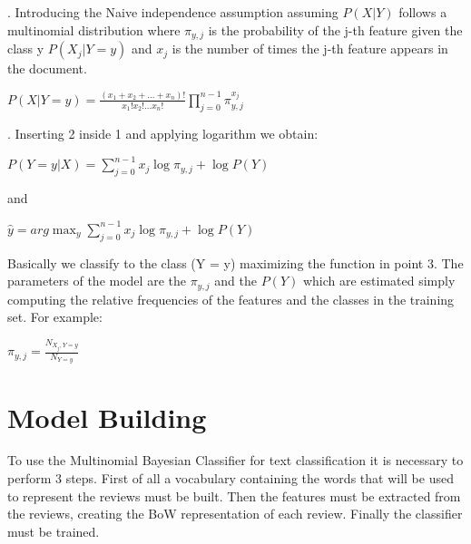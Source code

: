 \documentclass{article}
\begin{document}
\begin{multicols}{2}
. Introducing the Naive independence assumption assuming $P(X|Y)$ follows a multinomial distribution where $\pi_{y,j}$ is the probability of the j-th feature given the class y 
$P(X_j|Y=y)$ and ${x_j}$ is the number of times the j-th feature appears in the document.\\
    \vspace{0.3cm}\begin{center} 
        $
        P(X|Y = y) = \frac{(x_1 + x_2 + ... + x_n)!}{x_1!x_2!...x_n!} \prod_{j=0}^{n-1} \pi_{y,j}^{x_j}
        $ \end{center}\vspace{0.3cm}

. Inserting 2 inside 1 and applying logarithm we obtain:
    \vspace{0.3cm}\begin{center} ${P(Y = y|X)} = \sum_{j=0}^{n-1} x_j \log{\pi_{y,j}} + \log{P(Y)}$ \end{center}\vspace{0cm}
    \begin{center} and \end{center}\vspace{0cm}
    \begin{center} $\hat{y} = arg\max_y \sum_{j=0}^{n-1} x_j \log{\pi_{y,j}} + \log{P(Y)}$ \end{center}\vspace{0.3cm}

\noindent
Basically we classify to the class (Y = y) maximizing the function in point 3. The parameters of the model are the $\pi_{y,j}$ and the $P(Y)$ which are estimated simply
computing the relative frequencies of the features and the classes in the training set. For example:

    \vspace{0.3cm}\begin{center} $\pi_{y,j} = \frac{N_{X_j, Y=y}}{N_{Y=y}}$ \end{center}\vspace{0.3cm}




\section{Model Building}
To use the Multinomial Bayesian Classifier for text classification it is necessary to perform 3 steps. First of all a vocabulary containing the words that will be used
to represent the reviews must be built. Then the features must be extracted from the reviews, creating the BoW representation of each review. Finally the classifier 
must be trained.


\end{multicols}
\end{document}
